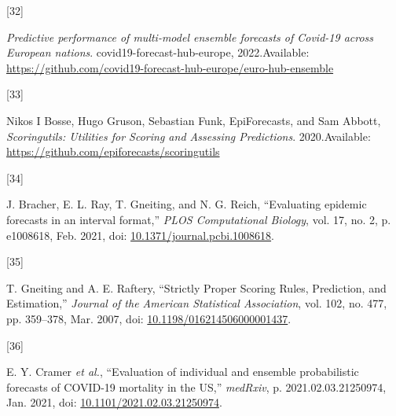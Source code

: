 \documentclass[
]{article}
\newlength{\cslhangindent}
\newlength{\csllabelwidth}
\newlength{\cslentryspacingunit} %
\newenvironment{CSLReferences}[2] %
 {%
  \setlength{\parindent}{0pt}
  \ifodd #1
  \let\oldpar\par
  \def\par{\hangindent=\cslhangindent\oldpar}
  \fi
  \setlength{\parskip}{#2\cslentryspacingunit}
 }%
 {}
\newcommand{\CSLLeftMargin}[1]{\parbox[t]{\csllabelwidth}{#1}}
\newcommand{\CSLRightInline}[1]{\parbox[t]{\linewidth - \csllabelwidth}{#1}\break}
\providecommand{\DIFaddbegin}{} %
\providecommand{\DIFaddend}{} %
\providecommand{\DIFdelbegin}{} %
\providecommand{\DIFdelend}{} %
\newcommand{\DIFscaledelfig}{0.5}
\newlength{\DIFdelgraphicswidth} %
\newlength{\DIFdelgraphicsheight} %
\newcommand{\DIFaddincludegraphics}[2][]{{\color{blue}\fbox{\DIFOincludegraphics[#1]{#2}}}} %
\newcommand{\DIFdelincludegraphics}[2][]{%
\sbox{\DIFdelgraphicsbox}{\DIFOincludegraphics[#1]{#2}}%
\settoboxwidth{\DIFdelgraphicswidth}{\DIFdelgraphicsbox} %
\settoboxtotalheight{\DIFdelgraphicsheight}{\DIFdelgraphicsbox} %
\scalebox{\DIFscaledelfig}{%
\parbox[b]{\DIFdelgraphicswidth}{\usebox{\DIFdelgraphicsbox}\\[-\baselineskip] \rule{\DIFdelgraphicswidth}{0em}}\llap{\resizebox{\DIFdelgraphicswidth}{\DIFdelgraphicsheight}{%
\setlength{\unitlength}{\DIFdelgraphicswidth}%
\begin{picture}(1,1)%
\thicklines\linethickness{2pt} %
{\color[rgb]{1,0,0}\put(0,0){\framebox(1,1){}}}%
{\color[rgb]{1,0,0}\put(0,0){\line( 1,1){1}}}%
{\color[rgb]{1,0,0}\put(0,1){\line(1,-1){1}}}%
\end{picture}%
}\hspace*{3pt}}} %
} %
\DeclareRobustCommand{\DIFaddbegin}{\DIFOaddbegin \let\includegraphics\DIFaddincludegraphics} %
\DeclareRobustCommand{\DIFaddend}{\DIFOaddend \let\includegraphics\DIFOincludegraphics} %
\DeclareRobustCommand{\DIFdelbegin}{\DIFOdelbegin \let\includegraphics\DIFdelincludegraphics} %
\DeclareRobustCommand{\DIFdelend}{\DIFOaddend \let\includegraphics\DIFOincludegraphics} %
\begin{document}
\begin{CSLReferences}{0}{0}
\leavevmode{}%
\DIFdelbegin %
\DIFdelend \DIFaddbegin \CSLLeftMargin{{[}32{]} }
\DIFaddend \CSLRightInline{\emph{Predictive performance of multi-model ensemble forecasts of {Covid-19} across {European} nations}. {covid19-forecast-hub-europe}, 2022.Available: \url{https://github.com/covid19-forecast-hub-europe/euro-hub-ensemble}}

\leavevmode{}%
\DIFdelbegin %
\DIFdelend \DIFaddbegin \CSLLeftMargin{{[}33{]} }
\DIFaddend \CSLRightInline{Nikos I Bosse, Hugo Gruson, Sebastian Funk, EpiForecasts, and Sam Abbott, \emph{Scoringutils: {Utilities} for {Scoring} and {Assessing Predictions}}. 2020.Available: \url{https://github.com/epiforecasts/scoringutils}}

\leavevmode{}%
\DIFdelbegin %
\DIFdelend \DIFaddbegin \CSLLeftMargin{{[}34{]} }
\DIFaddend \CSLRightInline{J. Bracher, E. L. Ray, T. Gneiting, and N. G. Reich, {``Evaluating epidemic forecasts in an interval format,''} \emph{PLOS Computational Biology}, vol. 17, no. 2, p. e1008618, Feb. 2021, doi: \href{https://doi.org/10.1371/journal.pcbi.1008618}{10.1371/journal.pcbi.1008618}.}

\leavevmode{}%
\DIFdelbegin %
\DIFdelend \DIFaddbegin \CSLLeftMargin{{[}35{]} }
\DIFaddend \CSLRightInline{T. Gneiting and A. E. Raftery, {``Strictly {Proper Scoring Rules}, {Prediction}, and {Estimation},''} \emph{Journal of the American Statistical Association}, vol. 102, no. 477, pp. 359--378, Mar. 2007, doi: \href{https://doi.org/10.1198/016214506000001437}{10.1198/016214506000001437}.}

\leavevmode{}%
\DIFdelbegin %
\DIFdelend \DIFaddbegin \CSLLeftMargin{{[}36{]} }
\DIFaddend \CSLRightInline{E. Y. Cramer \emph{et al.}, {``Evaluation of individual and ensemble probabilistic forecasts of {COVID-19} mortality in the {US},''} \emph{medRxiv}, p. 2021.02.03.21250974, Jan. 2021, doi: \href{https://doi.org/10.1101/2021.02.03.21250974}{10.1101/2021.02.03.21250974}.}


\end{CSLReferences}
\end{document}
